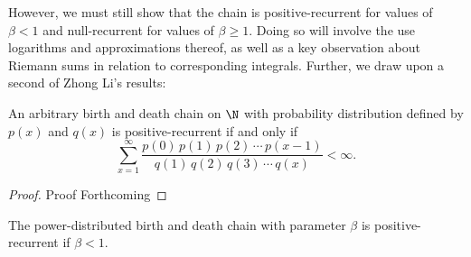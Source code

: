 However, we must still show that the chain is positive-recurrent for values of $\beta < 1$ and
null-recurrent for values of $\beta \geq 1$. Doing so will involve the use logarithms and approximations
thereof, as well as a key observation about Riemann sums in relation to corresponding integrals.
Further, we draw upon a second of Zhong Li's results:
\begin{proposition}
    An arbitrary birth and death chain on $\N$ with probability distribution defined by $p(x)$ and
    $q(x)$ is positive-recurrent if and only if
    \[
        \sum_{x=1}^{\infty} \frac{p(0)\, p(1)\, p(2)\, \cdots\, p(x-1)}{q(1)\, q(2)\, q(3)\, \cdots \,
        q(x)} < \infty.  
    \]
\end{proposition}
\begin{proof}
    Proof Forthcoming
\end{proof}
\begin{proposition}
    The power-distributed birth and death chain with parameter $\beta$ is positive-recurrent if $\beta
    < 1$.
\end{proposition}
